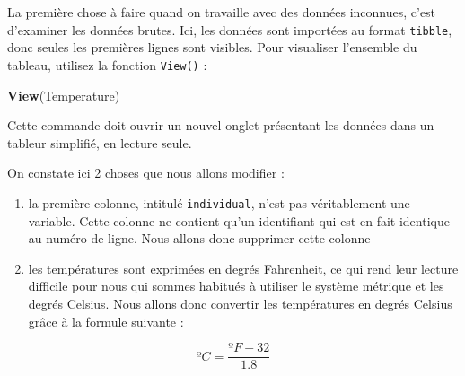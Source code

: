 \documentclass[a4paperpaper,]{article}
\newenvironment{Shaded}{\begin{snugshade}}{\end{snugshade}}
\newcommand{\CommentTok}[1]{\textcolor[rgb]{0.54,0.53,0.53}{#1}}
\newcommand{\DataTypeTok}[1]{\textcolor[rgb]{0.00,0.34,0.68}{#1}}
\newcommand{\DecValTok}[1]{\textcolor[rgb]{0.69,0.50,0.00}{#1}}
\newcommand{\FloatTok}[1]{\textcolor[rgb]{0.69,0.50,0.00}{#1}}
\newcommand{\KeywordTok}[1]{\textcolor[rgb]{0.12,0.11,0.11}{\textbf{#1}}}
\newcommand{\NormalTok}[1]{\textcolor[rgb]{0.12,0.11,0.11}{#1}}
\newcommand{\OperatorTok}[1]{\textcolor[rgb]{0.12,0.11,0.11}{#1}}
\newcommand{\StringTok}[1]{\textcolor[rgb]{0.75,0.01,0.01}{#1}}
\providecommand{\tightlist}{%
  \setlength{\itemsep}{0pt}\setlength{\parskip}{0pt}}
\begin{document}
La première chose à faire quand on travaille avec des données inconnues, c'est d'examiner les données brutes. Ici, les données sont importées au format \texttt{tibble}, donc seules les premières lignes sont visibles. Pour visualiser l'ensemble du tableau, utilisez la fonction \texttt{View()} :

\begin{Shaded}
\begin{Highlighting}[]
\KeywordTok{View}\NormalTok{(Temperature)}
\end{Highlighting}
\end{Shaded}

Cette commande doit ouvrir un nouvel onglet présentant les données dans un tableur simplifié, en lecture seule.

On constate ici 2 choses que nous allons modifier :

\begin{enumerate}
\def\labelenumi{\arabic{enumi}.}
\tightlist
\item
  la première colonne, intitulé \texttt{individual}, n'est pas véritablement une variable. Cette colonne ne contient qu'un identifiant qui est en fait identique au numéro de ligne. Nous allons donc supprimer cette colonne
\item
  les températures sont exprimées en degrés Fahrenheit, ce qui rend leur lecture difficile pour nous qui sommes habitués à utiliser le système métrique et les degrés Celsius. Nous allons donc convertir les températures en degrés Celsius grâce à la formule suivante :
\end{enumerate}

\[ºC = \frac{ºF - 32}{1.8}\]

\begin{Shaded}
\end{Shaded}
\end{document}
